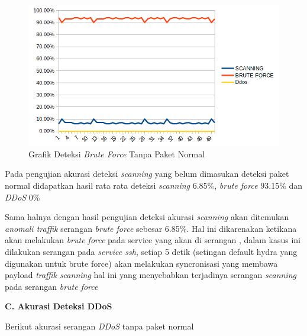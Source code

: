 	\begin{figure}[H]
		\centering
		\includegraphics[scale= 0.85]{gambar/brute}
		\caption{Grafik Deteksi \emph{Brute Force} Tanpa Paket Normal}
		\label{Grafik Deteksi Brute Force Tanpa Paket Normal}
	\end{figure}
	
	
	
	Pada pengujian akurasi deteksi \emph{scanning} yang belum dimasukan deteksi paket normal didapatkan hasil rata rata deteksi \emph{scanning} 6.85\%, \emph{brute force} 93.15\% dan \emph{DDoS} 0\% 
	
	Sama halnya dengan hasil pengujian deteksi akurasi \emph{scanning} akan ditemukan \emph{anomali traffik } serangan \emph{brute force} sebesar 6.85\%. Hal ini dikarenakan ketikana akan melakukan \emph{brute force} pada service yang akan di serangan , dalam kasus ini dilakukan serangan pada \emph{service ssh}, setiap 5 detik (setingan default hydra yang digunakan untuk brute force) akan melakukan syncronisasi yang membawa payload \emph{traffik scanning} hal ini yang menyebabkan terjadinya serangan \emph{scanning} pada serangan \emph{brute force}
	
		
		
		
		\newpage
		\noindent
		\textbf{C. Akurasi Deteksi DDoS}
		
				Berikut akurasi serangan \emph{DDoS} tanpa paket normal
		
